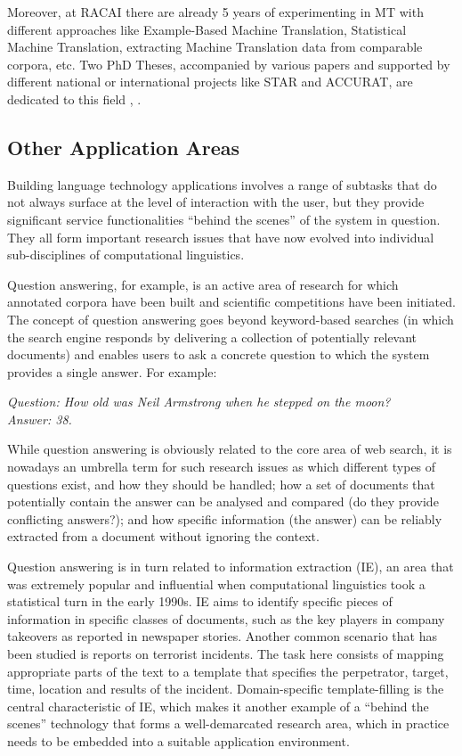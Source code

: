 \documentclass[]{../../metanetpaper}
\begin{document}
\begin{multicols}{2}
Moreover, at RACAI there are already 5 years of experimenting in MT with different approaches like Example-Based Machine Translation, Statistical Machine Translation, extracting Machine Translation data from comparable corpora, etc. Two PhD Theses, accompanied by various papers and supported by different national or international projects like STAR and ACCURAT, are dedicated to this field \cite{tufisMT}, \cite{irimia}.
 
\subsection{Other Application Areas}

Building language technology applications involves a range of subtasks that do not always surface at the level of interaction with the user, but they provide significant service functionalities “behind the scenes” of the system in question. They all form important research issues that have now evolved into individual sub-disciplines of computational linguistics.  

Question answering, for example, is an active area of research for which annotated corpora have been built and scientific competitions have been initiated. The concept of question answering goes beyond keyword-based searches (in which the search engine responds by delivering a collection of potentially relevant documents) and enables users to ask a concrete question to which the system provides a single answer. For example:

\textit{Question: How old was Neil Armstrong when he stepped on the moon?}\\
\textit{Answer: 38.}

While question answering is obviously related to the core area of web search, it is nowadays an umbrella term for such research issues as which different types of questions exist, and how they should be handled; how a set of documents that potentially contain the answer can be analysed and compared (do they provide conflicting answers?); and how specific information (the answer) can be reliably extracted from a document without ignoring the context. 


Question answering is in turn related to information extraction (IE), an area that was extremely popular and influential when computational linguistics took a statistical turn in the early 1990s. IE aims to identify specific pieces of information in specific classes of documents, such as the key players in company takeovers as reported in newspaper stories. Another common scenario that has been studied is reports on terrorist incidents. The task here consists of mapping appropriate parts of the text to a template that specifies the perpetrator, target, time, location and results of the incident. Domain-specific template-filling is the central characteristic of IE, which makes it another example of a “behind the scenes” technology that forms a well-demarcated research area, which in practice needs to be embedded into a suitable application environment. 


\end{multicols}
\end{document}
